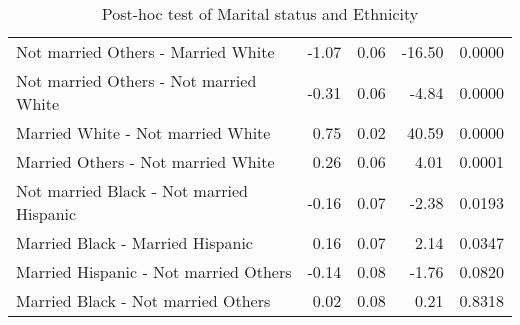 \begin{table}[H]
\begin{tabular}{lrrrr}
    Not married Others -  Married White & -1.07 & 0.06 & -16.50 & 0.0000 \\ 
    Not married Others -  Not married White & -0.31 & 0.06 & -4.84 & 0.0000 \\ 
    Married White -  Not married White & 0.75 & 0.02 & 40.59 & 0.0000 \\ 
    Married Others -  Not married White & 0.26 & 0.06 & 4.01 & 0.0001 \\ 
    Not married Black -  Not married Hispanic & -0.16 & 0.07 & -2.38 & 0.0193 \\ 
    Married Black -  Married Hispanic & 0.16 & 0.07 & 2.14 & 0.0347 \\ 
    Married Hispanic -  Not married Others & -0.14 & 0.08 & -1.76 & 0.0820 \\ 
    Married Black -  Not married Others & 0.02 & 0.08 & 0.21 & 0.8318 \\ 
   \hline
\end{tabular}
\caption{Post-hoc test of Marital status and Ethnicity} 
\label{tab:ms_race_origin}
\end{table}

